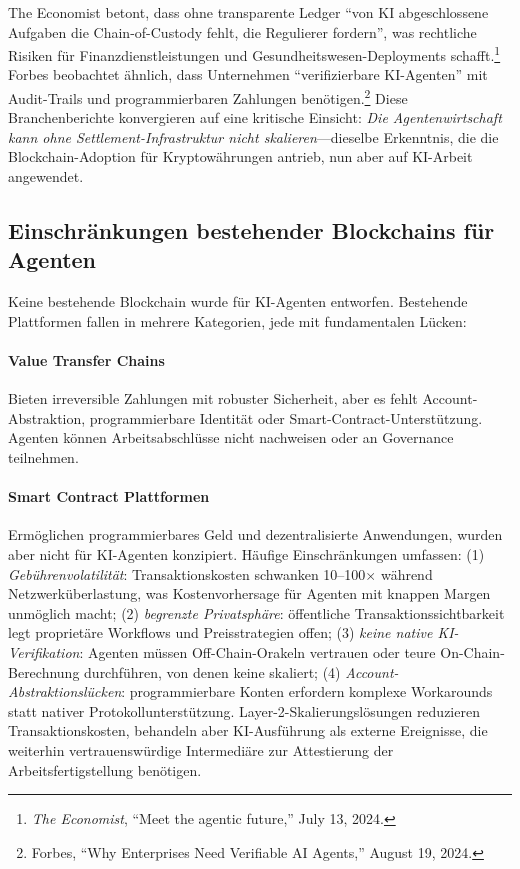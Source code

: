 \documentclass[11pt]{article}
\begin{document}
The Economist betont, dass ohne transparente Ledger ``von KI abgeschlossene Aufgaben die Chain-of-Custody fehlt, die Regulierer fordern'', was rechtliche Risiken für Finanzdienstleistungen und Gesundheitswesen-Deployments schafft.\footnote{\emph{The Economist}, ``Meet the agentic future,'' July 13, 2024.} Forbes beobachtet ähnlich, dass Unternehmen ``verifizierbare KI-Agenten'' mit Audit-Trails und programmierbaren Zahlungen benötigen.\footnote{Forbes, ``Why Enterprises Need Verifiable AI Agents,'' August 19, 2024.} Diese Branchenberichte konvergieren auf eine kritische Einsicht: \emph{Die Agentenwirtschaft kann ohne Settlement-Infrastruktur nicht skalieren}---dieselbe Erkenntnis, die die Blockchain-Adoption für Kryptowährungen antrieb, nun aber auf KI-Arbeit angewendet.

\subsection{Einschränkungen bestehender Blockchains für Agenten}
Keine bestehende Blockchain wurde für KI-Agenten entworfen. Bestehende Plattformen fallen in mehrere Kategorien, jede mit fundamentalen Lücken:

\paragraph{Value Transfer Chains} Bieten irreversible Zahlungen mit robuster Sicherheit, aber es fehlt Account-Abstraktion, programmierbare Identität oder Smart-Contract-Unterstützung. Agenten können Arbeitsabschlüsse nicht nachweisen oder an Governance teilnehmen.

\paragraph{Smart Contract Plattformen} Ermöglichen programmierbares Geld und dezentralisierte Anwendungen, wurden aber nicht für KI-Agenten konzipiert. Häufige Einschränkungen umfassen: (1) \emph{Gebührenvolatilität}: Transaktionskosten schwanken 10--100$\times$ während Netzwerküberlastung, was Kostenvorhersage für Agenten mit knappen Margen unmöglich macht; (2) \emph{begrenzte Privatsphäre}: öffentliche Transaktionssichtbarkeit legt proprietäre Workflows und Preisstrategien offen; (3) \emph{keine native KI-Verifikation}: Agenten müssen Off-Chain-Orakeln vertrauen oder teure On-Chain-Berechnung durchführen, von denen keine skaliert; (4) \emph{Account-Abstraktionslücken}: programmierbare Konten erfordern komplexe Workarounds statt nativer Protokollunterstützung. Layer-2-Skalierungslösungen reduzieren Transaktionskosten, behandeln aber KI-Ausführung als externe Ereignisse, die weiterhin vertrauenswürdige Intermediäre zur Attestierung der Arbeitsfertigstellung benötigen.
\end{document}
